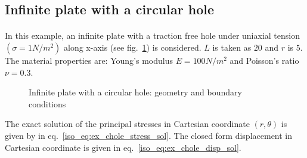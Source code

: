 \subsection{Infinite plate with a circular hole}
\paragraph{}
In this example, an infinite plate with a traction free hole under uniaxial tension $(\sigma = 1 N/m^2 )$ along x-axis (see fig.~\ref{qdt_fig:ex_chole_geo_bc}) is considered.
$L$ is taken as $20$ and $r$ is $5$.
The material properties are: Young’s modulus $E = 100 N/m^2$ and Poisson’s ratio $\nu = 0.3$.
    \begin{figure}[H]
        \centering
        \caption{ Infinite plate with a circular hole: geometry and boundary conditions}
        \label{qdt_fig:ex_chole_geo_bc}
    \end{figure}
    
The exact solution of the principal stresses in Cartesian coordinate $(r,\theta)$ is given by \cite{Sukumar2001} in eq.~\ref{iso_eq:ex_chole_stress_sol}.
The closed form displacement in Cartesian coordinate is given in eq.~\ref{iso_eq:ex_chole_disp_sol}.
